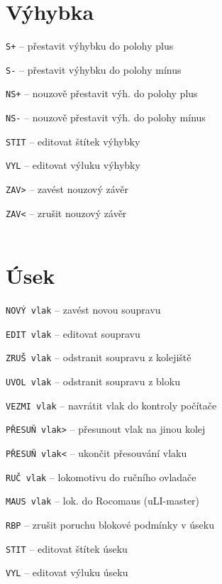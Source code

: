 \documentclass[12pt,a4paper,landscape]{article}
\begin{document}
\begin{multicols}{3}
\section{Výhybka}
\begin{compactitem}
	\item \texttt{S+} -- přestavit výhybku do polohy plus
	\item \texttt{S-} -- přestavit výhybku do polohy mínus
	\item \texttt{NS+} -- nouzově přestavit výh. do polohy plus
	\item \texttt{NS-} -- nouzově přestavit výh. do polohy mínus
	\item \texttt{STIT} -- editovat štítek výhybky
	\item \texttt{VYL} -- editovat výluku výhybky
	\item \texttt{ZAV>} -- zavést nouzový závěr
	\item \texttt{ZAV<} -- zrušit nouzový závěr
	\\
	\\
\end{compactitem}
	
\section{Úsek}
\begin{compactitem}
	\item \texttt{NOVÝ vlak} -- zavést novou soupravu
	\item \texttt{EDIT vlak} -- editovat soupravu
	\item \texttt{ZRUŠ vlak} -- odstranit soupravu z kolejiště
	\item \texttt{UVOL vlak} -- odstranit soupravu z bloku
	\item \texttt{VEZMI vlak} -- navrátit vlak do kontroly počítače
	\item \texttt{PŘESUŇ vlak>} -- přesunout vlak na jinou kolej
	\item \texttt{PŘESUŇ vlak<} -- ukončit přesouvání vlaku
	\item \texttt{RUČ vlak} -- lokomotivu do ručního ovladače
	\item \texttt{MAUS vlak} -- lok. do Rocomaus (uLI-master)
	\item \texttt{RBP} -- zrušit poruchu blokové podmínky v úseku

	\item \texttt{STIT} -- editovat štítek úseku
	\item \texttt{VYL} -- editovat výluku úseku


\end{compactitem}
\end{multicols}
\end{document}
